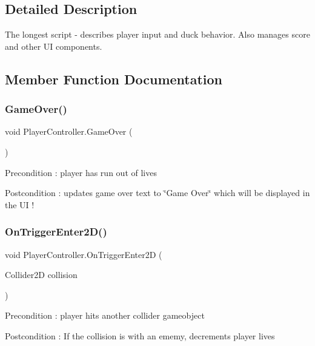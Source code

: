 \subsection{Detailed Description}
The longest script -\/ describes player input and duck behavior. Also manages score and other UI components. 

\subsection{Member Function Documentation}
\mbox{\label{class_player_controller_a022c877a529497a8fdb3fcf7e21cf090}} 
\subsubsection{\texorpdfstring{GameOver()}{GameOver()}}
{\footnotesize\ttfamily void Player\+Controller.\+Game\+Over (\begin{DoxyParamCaption}{ }\end{DoxyParamCaption})}

\begin{DoxyPrecond}{Precondition}
\+: player has run out of lives 
\end{DoxyPrecond}
\begin{DoxyPostcond}{Postcondition}
\+: updates game over text to \char`\"{}\+Game Over\char`\"{} which will be displayed in the UI ! 
\end{DoxyPostcond}
\mbox{\label{class_player_controller_a9cb907e7cb020bfa04ef52f158aa6fcb}} 
\subsubsection{\texorpdfstring{OnTriggerEnter2D()}{OnTriggerEnter2D()}}
{\footnotesize\ttfamily void Player\+Controller.\+On\+Trigger\+Enter2D (\begin{DoxyParamCaption}\item[{Collider2D}]{collision }\end{DoxyParamCaption})}

\begin{DoxyPrecond}{Precondition}
\+: player hits another collider gameobject 
\end{DoxyPrecond}
\begin{DoxyPostcond}{Postcondition}
\+: If the collision is with an ememy, decrements player lives 
\end{DoxyPostcond}


